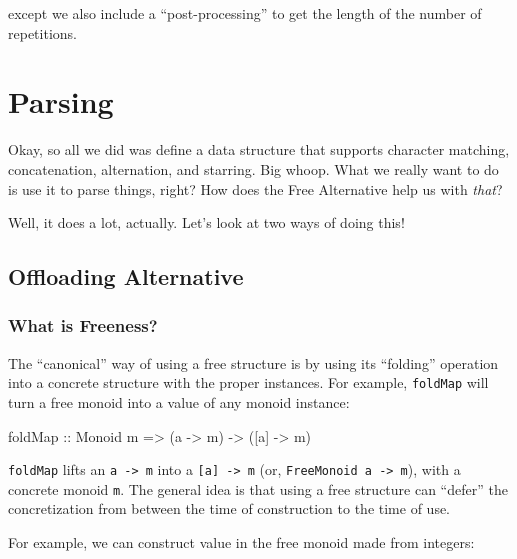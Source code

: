 \documentclass[]{article}
\newenvironment{Shaded}{}{}
\newcommand{\DataTypeTok}[1]{\textcolor[rgb]{0.56,0.13,0.00}{#1}}
\newcommand{\FunctionTok}[1]{\textcolor[rgb]{0.02,0.16,0.49}{#1}}
\newcommand{\NormalTok}[1]{#1}
\newcommand{\OtherTok}[1]{\textcolor[rgb]{0.00,0.44,0.13}{#1}}
\begin{document}
except we also include a ``post-processing'' to get the length of the number of
repetitions.

\hypertarget{parsing}{%
\section{Parsing}\label{parsing}}

Okay, so all we did was define a data structure that supports character
matching, concatenation, alternation, and starring. Big whoop. What we really
want to do is use it to parse things, right? How does the Free Alternative help
us with \emph{that}?

Well, it does a lot, actually. Let's look at two ways of doing this!

\hypertarget{offloading-alternative}{%
\subsection{Offloading Alternative}\label{offloading-alternative}}

\hypertarget{what-is-freeness}{%
\subsubsection{What is Freeness?}\label{what-is-freeness}}

The ``canonical'' way of using a free structure is by using its ``folding''
operation into a concrete structure with the proper instances. For example,
\texttt{foldMap} will turn a free monoid into a value of any monoid instance:

\begin{Shaded}
\begin{Highlighting}[]
\FunctionTok{foldMap}\OtherTok{ ::} \DataTypeTok{Monoid}\NormalTok{ m }\OtherTok{=>}\NormalTok{ (a }\OtherTok{->}\NormalTok{ m) }\OtherTok{->}\NormalTok{ ([a] }\OtherTok{->}\NormalTok{ m)}
\end{Highlighting}
\end{Shaded}

\texttt{foldMap} lifts an \texttt{a\ -\textgreater{}\ m} into a
\texttt{{[}a{]}\ -\textgreater{}\ m} (or,
\texttt{FreeMonoid\ a\ -\textgreater{}\ m}), with a concrete monoid \texttt{m}.
The general idea is that using a free structure can ``defer'' the concretization
from between the time of construction to the time of use.

For example, we can construct value in the free monoid made from integers:
\end{document}
